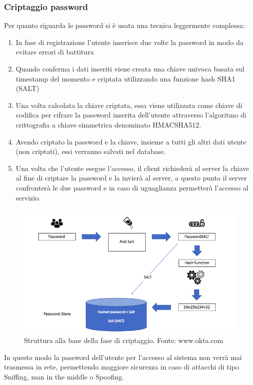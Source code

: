\documentclass[a4paper,final,12pt]{report}
\begin{document}
\subsubsection{Criptaggio password} 
Per quanto riguarda le password si è usata una tecnica leggermente complessa:
\begin{enumerate}
\item In fase di registrazione l'utente inserisce due volte la password in modo da evitare errori di battitura
\item Quando conferma i dati inseriti viene creata una chiave univoca basata sul timestamp del momento e criptata utilizzando una funzione hash SHA1 (SALT)
\item Una volta calcolata la chiave criptata, essa viene utilizzata come chiave di codifica per cifrare la password inserita dell'utente attraverso l'algoritmo di crittografia a chiave simmetrica denominato HMACSHA512. 
\item Avendo criptato la password e  la chiave, insieme a tutti gli altri dati utente (non criptati), essi verranno salvati nel database.
\item Una volta che l'utente esegue l'accesso, il client richiederà al server la chiave al fine di criptare la password e la invierà al server, a questo punto il server confronterà le due password e in caso di uguaglianza permetterà l'accesso al servizio.
\end{enumerate}
\begin{figure}[hbtp]
\centering
\includegraphics[scale=0.50]{img_concettuale/sale.png}
\caption{Struttura alla base della fase di criptaggio. Fonte: www.okta.com}
\end{figure}
In questo modo la password dell'utente per l'accesso al sistema non verrà mai trasmessa in rete, permettendo maggiore sicurezza in caso di attacchi di tipo Sniffing, man in the middle o Spoofing.  
\end{document}
